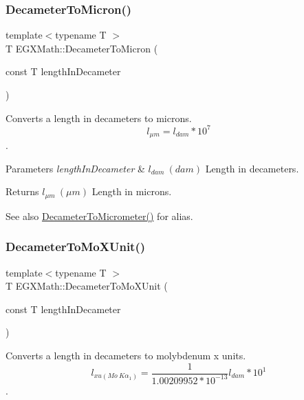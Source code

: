 \subsubsection{\texorpdfstring{Decameter\+To\+Micron()}{DecameterToMicron()}}
{\footnotesize\ttfamily template$<$typename T $>$ \\
T E\+G\+X\+Math\+::\+Decameter\+To\+Micron (\begin{DoxyParamCaption}\item[{const T}]{length\+In\+Decameter }\end{DoxyParamCaption})}



Converts a length in decameters to microns. \[ l_{\mu m}=l_{dam} * 10^{7} \]. 


\begin{DoxyParams}{Parameters}
{\em length\+In\+Decameter} & $ l_{dam}\ (dam)$ Length in decameters. \\
\hline
\end{DoxyParams}
\begin{DoxyReturn}{Returns}
$ l_{\mu m}\ (\mu m)$ Length in microns. 
\end{DoxyReturn}
\begin{DoxySeeAlso}{See also}
\mbox{\hyperlink{group___e_g_x_math-_conversions-_length_conversions-_decameter-_s_i_gaa5b6d3a32a921345aa1ccb66a8df07c1}{Decameter\+To\+Micrometer()}} for alias. 
\end{DoxySeeAlso}
\mbox{\label{group___e_g_x_math-_conversions-_length_conversions-_decameter-_non-_s_i_ga9e345feeb2568ded9fdceaf1d23d0ca6}} 
\subsubsection{\texorpdfstring{Decameter\+To\+Mo\+X\+Unit()}{DecameterToMoXUnit()}}
{\footnotesize\ttfamily template$<$typename T $>$ \\
T E\+G\+X\+Math\+::\+Decameter\+To\+Mo\+X\+Unit (\begin{DoxyParamCaption}\item[{const T}]{length\+In\+Decameter }\end{DoxyParamCaption})}



Converts a length in decameters to molybdenum x units. \[ l_{xu(Mo\ K\alpha_1)}=\frac{1}{1.00209952*10^{-13}} l_{dam} * 10^{1}\]. 


